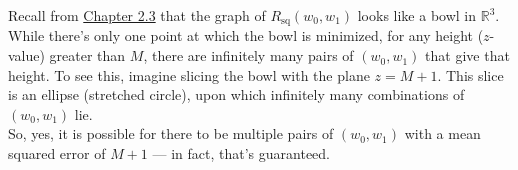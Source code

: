 \documentclass[11pt]{article}
\begin{document}
\begin{prob}[(14 pts)]
\begin{subprob}
\begin{solution}
Recall from \href{https://notes.eecs245.org/simple-linear-regression/finding-optimal-parameters/}{Chapter 2.3} that the graph of $R_\text{sq}(w_0, w_1)$ looks like a bowl in $\mathbb{R}^3$. While there's only one point at which the bowl is minimized, for any height ($z$-value) greater than $M$, there are infinitely many pairs of $(w_0, w_1)$ that give that height. To see this, imagine slicing the bowl with the plane $z = M + 1$. This slice is an ellipse (stretched circle), upon which infinitely many combinations of $(w_0, w_1)$ lie. \\

So, yes, it is possible for there to be multiple pairs of $(w_0, w_1)$ with a mean squared error of $M + 1$ --- in fact, that's guaranteed.
\end{solution}

\end{subprob}

\end{prob}

\newpage
\end{document}
